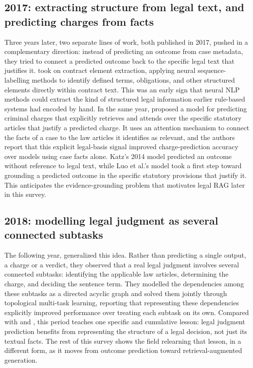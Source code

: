 \subsection{2017: extracting structure from legal text, and predicting charges from facts}

Three years later, two separate lines of work, both published in 2017, pushed in a complementary
direction: instead of predicting an outcome from case metadata, they tried to connect a predicted
outcome back to the specific legal text that justifies it. \citet{chalkidis2017} took on contract
element extraction, applying neural sequence-labelling methods to identify defined terms,
obligations, and other structured elements directly within contract text. This was an early sign
that neural NLP methods could extract the kind of structured legal information earlier rule-based
systems had encoded by hand. In the same year, \citet{luo2017} proposed a model for predicting
criminal charges that explicitly retrieves and attends over the specific statutory articles that
justify a predicted charge. It uses an attention mechanism to connect the facts of a case to the law
articles it identifies as relevant, and the authors report that this explicit legal-basis signal
improved charge-prediction accuracy over models using case facts alone. Katz's 2014 model predicted
an outcome without reference to legal text, while Luo et al.'s model took a first step toward
grounding a predicted outcome in the specific statutory provisions that justify it. This anticipates
the evidence-grounding problem that motivates legal RAG later in this survey.

\subsection{2018: modelling legal judgment as several connected subtasks}

The following year, \citet{zhong2018} generalized this idea. Rather than predicting a single output,
a charge or a verdict, they observed that a real legal judgment involves several connected subtasks:
identifying the applicable law articles, determining the charge, and deciding the sentence term.
They modelled the dependencies among these subtasks as a directed acyclic graph and solved them
jointly through topological multi-task learning, reporting that representing these dependencies
explicitly improved performance over treating each subtask on its own. Compared with
\citet{katz2014} and \citet{luo2017}, this period teaches one specific and cumulative lesson: legal
judgment prediction benefits from representing the structure of a legal decision, not just its
textual facts. The rest of this survey shows the field relearning that lesson, in a different form,
as it moves from outcome prediction toward retrieval-augmented generation.

